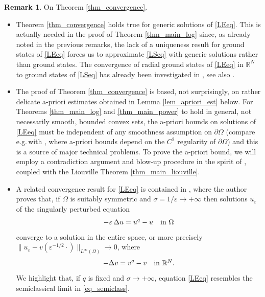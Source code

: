 \documentclass[12pt]{amsart}
\numberwithin{equation}{section}
\theoremstyle{plain}
\theoremstyle{plain}
\theoremstyle{plain}
\theoremstyle{definition}
\newtheorem{remark}[theorem]{Remark}
\newcommand{\R}{{\mathbb R}}
\newcommand{\eps}{\varepsilon}
\begin{document}
\begin{remark}\label{rem_Th_convergence} 
On Theorem \ref{thm_convergence}. 
\begin{itemize}[leftmargin=*]
\item
Theorem \ref{thm_convergence} holds true for generic solutions of \eqref{LEeq}. 
This is actually needed in the proof of Theorem \ref{thm_main_log} since, as already noted in the previous remarks, the lack of a uniqueness result for ground states of \eqref{LEeq} forces us to approximate \eqref{LSeq} with generic solutions rather than ground states. 
The convergence of radial ground states of \eqref{LEeq} in $\R^N$ to ground states of \eqref{LSeq} has already been investigated in \cite{WaZh19}, see also \cite{Car22}. 
\item
The proof of Theorem \ref{thm_convergence} is based, not surprisingly, on rather delicate a-priori estimates obtained in Lemma \ref{lem_apriori_est} below. 
For Theorems \ref{thm_main_log} and \ref{thm_main_power} to hold in general, not necessarily smooth, bounded convex sets, the a-priori bounds on solutions of \eqref{LEeq} must be independent of any smoothness assumption on $\partial\Omega$ (compare e.g.$\,$with \cite{DLN82}, where a-priori bounds depend on the $C^2$ regularity of $\partial\Omega$) and this is a source of major technical problems. 
To prove the a-priori bound, we will employ a contradiction argument and blow-up procedure in the spirit of \cite{GiSp81}, coupled with the Liouville Theorem \ref{thm_main_liouville}. 

\item
A related convergence result for \eqref{LEeq} is contained in \cite[Theorem 1]{Dan95}, where the author proves that, if $\Omega$ is suitably symmetric and $\sigma = 1/\eps\to +\infty$ then solutions $u_{\eps}$ of the singularly perturbed equation
\begin{equation}\label{eq_semiclass}
-\eps \,\Delta u = u^q - u \quad \hbox{in $\Omega$}
\end{equation}
 converge to a solution in the entire space, or more precisely $\|u_{\eps} - v(\eps^{-1/2} \cdot)\|_{L^{\infty}(\Omega)} \to 0$, where
 $$-\Delta v = v^q - v \quad \hbox{in $\R^N$.}$$
We highlight that, if $q$ is fixed and $\sigma \to +\infty$, equation \eqref{LEeq} resembles the semiclassical limit in \eqref{eq_semiclass}.
 \end{itemize}
 \end{remark}
 
\end{document}
